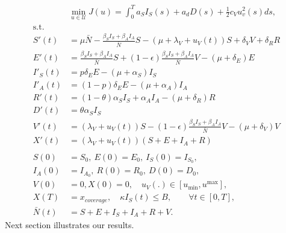   \begin{equation}
    \label{eqn:optimal_control_problem}
    \begin{aligned}
      & \min_{u \in \mathcal U}
        J(u) =
        \int_0 ^ T
          a_S I_S(s) + a_d D(s) +
          \frac{1}{2}
            c_V u_v^2(s)
            ds,
      \\
      \text{s.t.} &
      \\
      S'(t)
        &=
          \mu \bar{N}-\frac{\beta_S
          I_S+\beta_AI_A}{\bar{N}}S -
          (\mu + \lambda_V + u_V(t))S + \delta_V V + \delta_R R
        \\
      E'(t)
        &=
          \frac{\beta_S I_S+\beta_AI_A}{\bar{N}}S+(1-\epsilon) \frac{\beta_S I_S+\beta_AI_A}{\bar{N}}V
          -(\mu+\delta_E) E
        \\
      I'_S(t)
        &=p
          \delta_E
          E-(\mu + \alpha_S) I_S
        \\
      I'_A(t)
        &= (1 - p) \delta_E E-(\mu + \alpha_A) I_A
        \\
      R'(t)
        &= (1 - \theta) \alpha_S I_S + \alpha_A I_A
           - (\mu + \delta_R) R
        \\
      D'(t)&=
        \theta \alpha_S I_S
        \\
      V'(t)&=
        (\lambda_V + u_V(t)) S - (1 -\epsilon)
        \frac{\beta_S I_S + \beta_AI_A}{\bar{N}} V
        -(\mu + \delta_V) V
        \\
      X'(t)&=
        (\lambda_V + u_V(t))(S + E + I_A + R)
      \\
      \\
       S(0) &= S_0, \ E(0) = E_0, \ I_S(0) = I_{S_{0}},
      \\
      I_A(0) &= I_{A_{0}}, \ R(0) = R_0, \ D(0) = D_0,
      \\
      V(0) &= 0, X(0) = 0, \quad
      u_V(.) \in [u_{\min}, u^{\max}],
      \\
      X(T) &= x_{coverage},
      \quad
       \kappa I_S(t) \leq B, \qquad \forall t \in [0, T],
      \\
      \bar{N}(t) &= S + E + I_S + I_A + R + V.
    \end{aligned}
  \end{equation}
Next section illustrates our results.